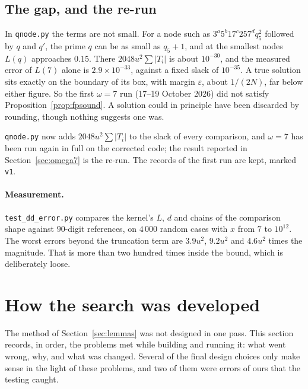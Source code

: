 \documentclass[11pt]{amsart}
\theoremstyle{remark}
\begin{document}
\subsection{The gap, and the re-run}\label{sec:fpgap}
In \texttt{qnode.py} the terms are not small. For a node such as
$3^{a} 5^{b} 17^{c} 257^{d} q_5^{2}$ followed by $q$ and $q'$, the prime $q$ can be
as small as $q_5 + 1$, and at the smallest nodes $L(q)$ approaches $0.15$. There
$2048u^{2}\sum|T_i|$ is about $10^{-30}$, and the measured error of $L(7)$ alone
is $2.9 \times 10^{-33}$, against a fixed slack of $10^{-35}$. A true solution
sits exactly on the boundary of its box, with margin $\varepsilon$, about
$1/(2N)$, far below either figure. So the first $\omega = 7$ run (17--19 October
2026) did not satisfy Proposition~\ref{prop:fpsound}. A solution could in
principle have been discarded by rounding, though nothing suggests one was.

\texttt{qnode.py} now adds $2048u^{2}\sum|T_i|$ to the slack of every comparison,
and $\omega = 7$ has been run again in full on the corrected code; the result
reported in Section~\ref{sec:omega7} is the re-run. The records of the first run
are kept, marked \texttt{v1}.

\paragraph{Measurement.} \texttt{test\_dd\_error.py} compares the kernel's $L$,
$d$ and chains of the comparison shape against $90$-digit references, on $4\,000$
random cases with $x$ from $7$ to $10^{12}$. The worst errors beyond the
truncation term are $3.9u^{2}$, $9.2u^{2}$ and $4.6u^{2}$ times the magnitude. That
is more than two hundred times inside the bound, which is deliberately loose.

\section{How the search was developed}\label{sec:history}

The method of Section~\ref{sec:lemmas} was not designed in one pass. This
section records, in order, the problems met while building and running it: what
went wrong, why, and what was changed. Several of the final design choices only
make sense in the light of these problems, and two of them were errors of ours
that the testing caught.
\end{document}
